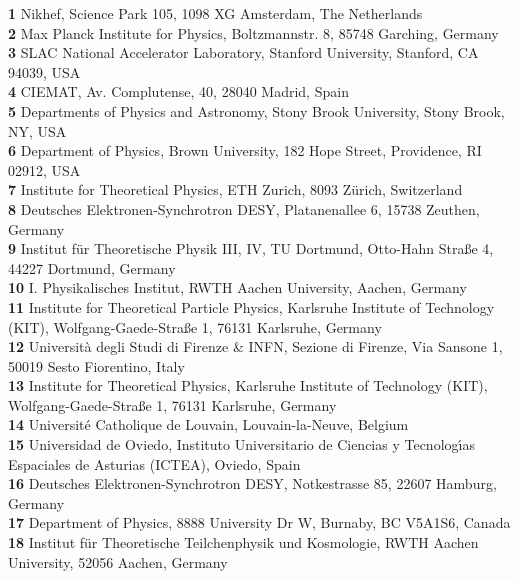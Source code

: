 \documentclass{SciPost_better_arXiv}
\begin{document}
\begin{center}
{\normalsize
  {\bf 1} Nikhef, Science Park 105, 1098 XG Amsterdam, The Netherlands\\
  {\bf 2} Max Planck Institute for Physics, Boltzmannstr. 8, 85748 Garching, Germany\\
  {\bf 3} SLAC National Accelerator Laboratory, Stanford University, Stanford, CA 94039, USA\\
  {\bf 4} CIEMAT, Av. Complutense, 40, 28040 Madrid, Spain\\
  {\bf 5} Departments of Physics and Astronomy, Stony Brook University, Stony Brook, NY, USA\\
  {\bf 6} Department of Physics, Brown University, 182 Hope Street, Providence, RI 02912, USA\\
  {\bf 7} Institute for Theoretical Physics, ETH Zurich, 8093 Z\"urich, Switzerland\\
  {\bf 8} Deutsches Elektronen-Synchrotron DESY, Platanenallee 6, 15738 Zeuthen, Germany\\
  {\bf 9} Institut f\"ur Theoretische Physik III, IV, TU Dortmund, Otto-Hahn Stra\ss{}e 4, 44227 Dortmund, Germany\\
  {\bf 10} I. Physikalisches Institut, RWTH Aachen University, Aachen, Germany\\
  {\bf 11} Institute for Theoretical Particle Physics, Karlsruhe Institute of Technology (KIT), Wolfgang-Gaede-Stra\ss{}e 1, 76131 Karlsruhe, Germany\\
  {\bf 12} Universit\`{a} degli Studi di Firenze \& INFN, Sezione di Firenze, Via Sansone 1, 50019 Sesto Fiorentino, Italy\\
  {\bf 13} Institute for Theoretical Physics, Karlsruhe Institute of Technology (KIT), Wolfgang-Gaede-Stra\ss{}e 1, 76131 Karlsruhe, Germany\\
  {\bf 14} Universit\'{e} Catholique de Louvain, Louvain-la-Neuve, Belgium\\
  {\bf 15} Universidad de Oviedo, Instituto Universitario de Ciencias y Tecnolog\'{\i}as Espaciales de Asturias (ICTEA), Oviedo, Spain\\
  {\bf 16} Deutsches Elektronen-Synchrotron DESY, Notkestrasse 85, 22607 Hamburg, Germany\\
  {\bf 17} Department of Physics, 8888 University Dr W, Burnaby, BC V5A1S6, Canada\\
  {\bf 18} Institut f\"ur Theoretische Teilchenphysik und Kosmologie, RWTH Aachen University, 52056 Aachen, Germany\\
}
\end{center}
\end{document}
